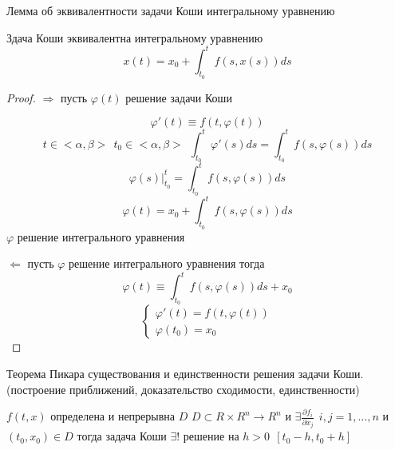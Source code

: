 \begin{title}[\Large]
  Лемма об эквивалентности задачи Коши интегральному уравнению
\end{title}

\begin{block}[Лемма]
  Здача Коши эквивалентна интегральному уравнению
  $$
  x(t) = x_0 + \int_{t_0}^t f(s, x(s))ds
  $$
\end{block}

\begin{proof}
  $\Rightarrow$ пусть $\varphi(t)$ решение задачи Коши

  $$
  \varphi'(t) \equiv f(t, \varphi(t))
  $$
  $$
  t \in <\alpha, \beta> ~~ t_0 \in <\alpha, \beta> ~~ \int_{t_0}^t
  \varphi'(s)ds = \int_{t_0}^tf(s, \varphi(s))ds
  $$
  $$
  \varphi(s)|_{t_0}^t = \int_{t_0}^t f(s, \varphi(s))ds
  $$
  $$
  \varphi(t) = x_0 + \int_{t_0}^t f(s, \varphi(s))ds
  $$
  $\varphi$ решение интегрального уравнения

  $\Leftarrow$ пусть $\varphi$ решение интегрального уравнения тогда
  $$
  \varphi(t) \equiv \int_{t_0}^t f(s, \varphi(s))ds + x_0
  $$
  $$
  \left\{
  \begin{array}{l}
    \varphi'(t) = f(t, \varphi(t)) \\
    \varphi(t_0) = x_0
  \end{array}
  \right.
  $$
\end{proof}

\begin{title}[\Large]
  Теорема Пикара существования и единственности решения задачи Коши.
  (построение приближений, доказательство сходимости, единственности)
\end{title}

\begin{theorem}
  $f(t, x)$ определена и непрерывна $D$ $D\subset R \times R^n \to
  R^n$ и
  $\exists \frac{\partial f_i}{\partial x_j} ~~ i,j = 1, \ldots, n$ и
  $(t_0, x_0) \in D$ тогда задача Коши $\exists!$ решение
  на $h > 0 ~~ [t_0 - h, t_0 + h]$
\end{theorem}

